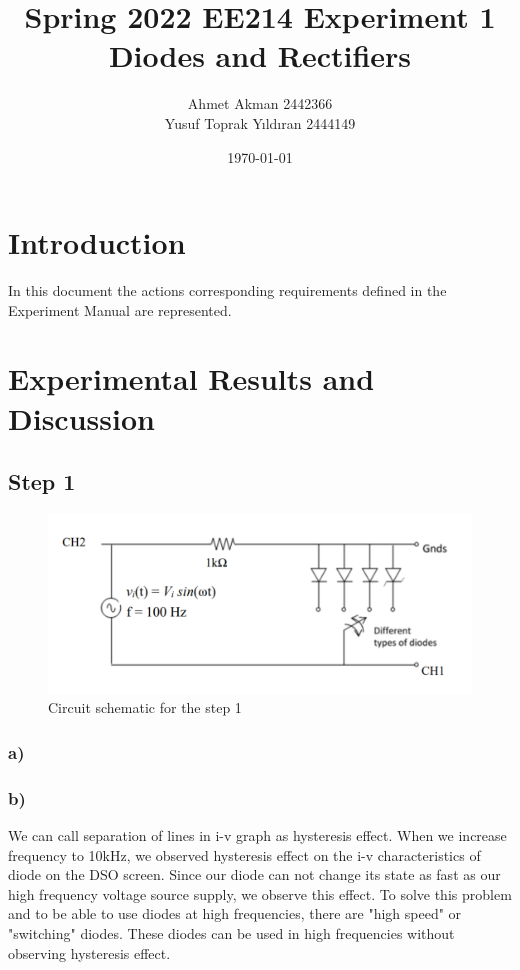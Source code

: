 \documentclass[letterpaper,12pt]{article}
\begin{document}
\title{Spring 2022 EE214 Experiment 1  \protect\\ Diodes and Rectifiers}
\author{Ahmet Akman 2442366 \protect\\ Yusuf Toprak Yıldıran 2444149}
\date{\today}
\maketitle
\tableofcontents
\section{Introduction}
In this document the actions corresponding requirements defined in the Experiment Manual are  represented.

\section{Experimental Results and Discussion}

\subsection{Step 1}

\begin{figure}[H]
\centering
\includegraphics[width=1\textwidth]{1_1.png}
\caption{Circuit schematic for the step 1}
\end{figure} 

\subsubsection{a)}
\subsubsection{b)}


We can call separation of lines in i-v graph as hysteresis effect. When we increase frequency to 10kHz, we observed hysteresis effect on the i-v characteristics of diode on the DSO screen. Since our diode can not change its state as fast as our high frequency voltage source supply, we observe this effect. To solve this problem and to be able to use diodes at high frequencies, there are "high speed" or "switching" diodes. These diodes can be used in high frequencies without observing hysteresis effect.
\end{document}
